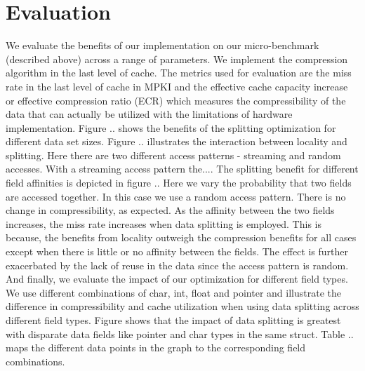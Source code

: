 \section{Evaluation}
\label{sec:eval}
We evaluate the benefits of our implementation on our micro-benchmark (described above) across a range of parameters. We implement the compression algorithm in the last level of cache. The metrics used for evaluation are the miss rate in the last level of cache in MPKI and the effective cache capacity increase or effective compression ratio (ECR) which measures the compressibility of the data that can actually be utilized with the limitations of hardware implementation. Figure .. shows the benefits of the splitting optimization for different data set sizes. Figure .. illustrates the interaction between locality and splitting. Here there are two different access patterns - streaming and random accesses. With a streaming access pattern the.... The splitting benefit for different field affinities is depicted in figure .. Here we vary the probability that two fields are accessed together. In this case we use a random access pattern. There is no change in compressibility, as expected. As the affinity between the two fields increases, the miss rate increases when data splitting is employed. This is because, the benefits from locality outweigh the compression benefits for all cases except when there is little or no affinity between the fields. The effect is further exacerbated by the lack of reuse in the data since the access pattern is random. And finally, we evaluate the impact of our optimization for different field types. We use different combinations of char, int, float and pointer and illustrate the difference in compressibility and cache utilization when using data splitting across different field types. Figure shows that the impact of data splitting is greatest with disparate data fields like pointer and char types in the same struct. Table .. maps the different data points in the graph to the corresponding field combinations. 

